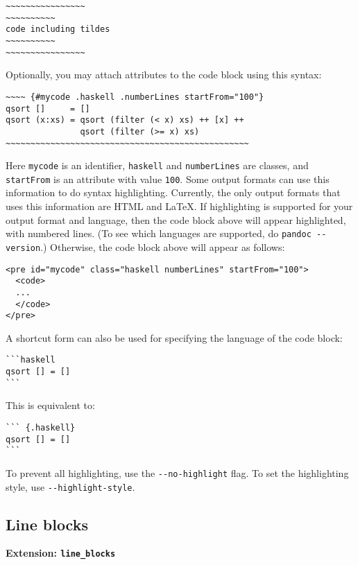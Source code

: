 \documentclass[]{article}
\begin{document}
\begin{verbatim}
~~~~~~~~~~~~~~~~
~~~~~~~~~~
code including tildes
~~~~~~~~~~
~~~~~~~~~~~~~~~~
\end{verbatim}

Optionally, you may attach attributes to the code block using this
syntax:

\begin{verbatim}
~~~~ {#mycode .haskell .numberLines startFrom="100"}
qsort []     = []
qsort (x:xs) = qsort (filter (< x) xs) ++ [x] ++
               qsort (filter (>= x) xs)
~~~~~~~~~~~~~~~~~~~~~~~~~~~~~~~~~~~~~~~~~~~~~~~~~
\end{verbatim}

Here \texttt{mycode} is an identifier, \texttt{haskell} and
\texttt{numberLines} are classes, and \texttt{startFrom} is an attribute
with value \texttt{100}. Some output formats can use this information to
do syntax highlighting. Currently, the only output formats that uses
this information are HTML and LaTeX. If highlighting is supported for
your output format and language, then the code block above will appear
highlighted, with numbered lines. (To see which languages are supported,
do \texttt{pandoc -{}-version}.) Otherwise, the code block above will
appear as follows:

\begin{verbatim}
<pre id="mycode" class="haskell numberLines" startFrom="100">
  <code>
  ...
  </code>
</pre>
\end{verbatim}

A shortcut form can also be used for specifying the language of the code
block:

\begin{verbatim}
```haskell
qsort [] = []
```
\end{verbatim}

This is equivalent to:

\begin{verbatim}
``` {.haskell}
qsort [] = []
```
\end{verbatim}

To prevent all highlighting, use the \texttt{-{}-no-highlight} flag. To
set the highlighting style, use \texttt{-{}-highlight-style}.

\subsection{Line blocks}\label{line-blocks}

\textbf{Extension: \texttt{line\_blocks}}
\end{document}
